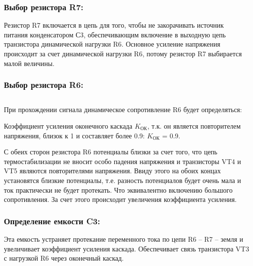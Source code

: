  \subsubsection{Выбор резистора R7:} 
 
\begin{equation}
\label{eq:equation3_2}

\end{equation}
Резистор R7 включается в цепь для того, чтобы не закорачивать источник питания конденсатором С3, обеспечивающим включение в выходную цепь транзистора динамической нагрузки R6. Основное усиление напряжения происходит за счет динамической нагрузки R6, потому резистор R7 выбирается малой величины.

\subsubsection{Выбор резистора R6:} 
\begin{equation}
\label{eq:equation3_3}
 
\end{equation}

При прохождении сигнала динамическое сопротивление R6 будет определяться:
\begin{equation}
\label{eq:equation3_4}
 
\end{equation}

Коэффициент усиления оконечного каскада $K_{\text{ОК}}$, т.к. он является повторителем напряжения, близок к 1 и составляет более 0.9: $K_{\text{ОК}}$ = 0.9. \par
С обеих сторон резистора R6 потенциалы близки за счет того, что цепь термостабилизации не вносит особо падения напряжения и транзисторы VT4 и VT5 являются повторителями напряжения. Ввиду этого на обоих концах установятся близкие потенциалы, т.е. разность потенциалов будет очень мала и ток практически не будет протекать. Что эквивалентно включению большого сопротивления. За счет этого происходит увеличения коэффициента усиления. \par

\subsubsection{Определение емкости C3:} 
Эта емкость устраняет протекание переменного тока по цепи R6 – R7 – земля и увеличивает коэффициент усиления каскада. Обеспечивает связь транзистора VT3 с нагрузкой R6 через оконечный каскад. \par
\begin{equation}
\label{eq:equation3_5}
 
\end{equation}


